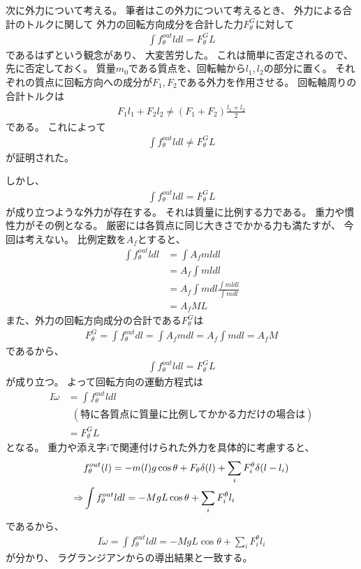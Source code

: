 \documentclass[a4paper,11pt]{jsarticle}
\begin{document}
次に外力について考える。
筆者はこの外力について考えるとき、
外力による合計のトルクに関して
外力の回転方向成分を合計した力$F_\theta^G$に対して
\begin{align*}
  \int f_\theta^{out} l dl = F_\theta^G L
\end{align*}
であるはずという観念があり、
大変苦労した。
これは簡単に否定されるので、
先に否定しておく。
質量$m_0$である質点を、回転軸から$l_1, l_2$の部分に置く。
それぞれの質点に回転方向への成分が$F_1, F_2$である外力を作用させる。
回転軸周りの合計トルクは
\begin{align*}
  F_1 l_1 + F_2 l_2
  \neq
  (F_1 + F_2) \frac{l_1 + l_2}{2}
\end{align*}
である。
これによって
\begin{align*}
  \int f_\theta^{out} l dl \neq F_\theta^G L
\end{align*}
が証明された。

しかし、
\begin{align*}
  \int f_\theta^{out} l dl = F_\theta^G L
\end{align*}
が成り立つような外力が存在する。
それは質量に比例する力である。
重力や慣性力がその例となる。
厳密には各質点に同じ大きさでかかる力も満たすが、
今回は考えない。
比例定数を$A_f$とすると、
\begin{align*}
  \int f_\theta^{out} l dl
  &= \int A_f m l dl
  \\
  &= A_f \int m l dl
  \\
  &= A_f \int m dl \frac{\int mldl}{\int mdl}
  \\
  &= A_f M L
\end{align*}
また、外力の回転方向成分の合計である$F_\theta^G$は
\begin{align*}
  F_\theta^G
  = \int f_\theta^{out} dl
  = \int A_f m dl
  = A_f \int mdl
  = A_f M
\end{align*}
であるから、
\begin{align*}
  \int f_\theta^{out} l dl = F_\theta^G L
\end{align*}
が成り立つ。
よって回転方向の運動方程式は
\begin{align*}
  I\dot\omega 
  &= \int f_\theta^{out} l dl
  \\
  & \ \ \left( \mathrm{特に各質点に質量に比例してかかる力だけの場合は} \right)
  \\
  &= F_\theta^G L
\end{align*}
となる。
重力や添え字$i$で関連付けられた外力を具体的に考慮すると、
\begin{align}
  & f_\theta^{out}(l) = -m(l)g \cos\theta + F_\theta \delta(l) + \sum_i F_i^\theta \delta( l - l_i )
  \label{eq:newton:f_theta_out_conf}
  \\
  \Rightarrow
  & \int f_\theta^{out} l dl = -MgL \cos\theta + \sum_i F_i^\theta l_i
  \notag
\end{align}
であるから、
\begin{align}
  I\dot\omega 
  = \int f_\theta^{out} l dl
  = -MgL\cos\theta + \sum_i F_i^\theta l_i
  \label{eq:newton:theta_end}
\end{align}
が分かり、
ラグランジアンからの導出結果と一致する。
\end{document}
